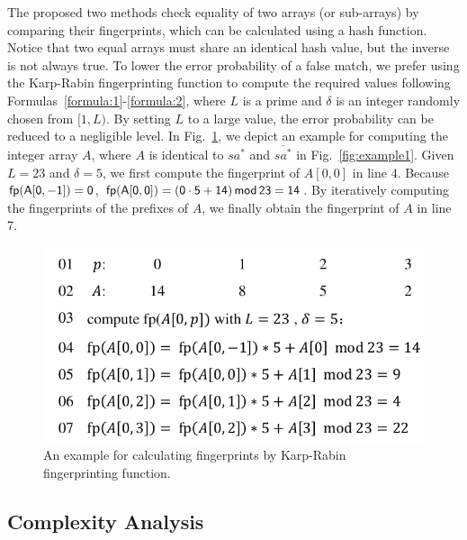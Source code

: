 \documentclass[10pt,journal,compsoc]{IEEEtran}
\begin{document}
The proposed two methods check equality of two arrays (or sub-arrays) by comparing their fingerprints, which can be calculated using a hash function. Notice that two equal arrays must share an identical hash value, but the inverse is not always true. To lower the error probability of a false match, we prefer using the Karp-Rabin fingerprinting function to compute the required values following Formulas~\ref{formula:1}-\ref{formula:2}, where $L$ is a prime and $\delta$ is an integer randomly chosen from $[1, L)$. By setting $L$ to a large value, the error probability can be reduced to a negligible level. In Fig.~\ref{fig:example2}, we depict an example for computing the integer array $A$, where $A$ is identical to $sa^*$ and $\overline{sa^*}$ in Fig.~\ref{fig:example1}. Given $L = 23$ and $\delta = 5$, we first compute the fingerprint of $A[0, 0]$ in line 4. Because $\sf fp(A[0, -1]) = 0$, $\sf fp(A[0, 0]) = (0 \cdot 5 + 14) \, mod \, 23 = 14$. By iteratively computing the fingerprints of the prefixes of $A$, we finally obtain the fingerprint of $A$ in line 7.

\begin{figure}[htbp!]
	\centering
	
	\includegraphics[width = 1\columnwidth]{example2.pdf}
	
	\caption{An example for calculating fingerprints by Karp-Rabin fingerprinting function.}
	
	\label{fig:example2}
	
\end{figure}

\subsection{Complexity Analysis}
\end{document}
